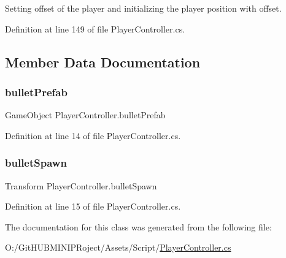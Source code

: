 Setting offset of the player and initializing the player position with offset. 



Definition at line 149 of file Player\+Controller.\+cs.



\subsection{Member Data Documentation}
\mbox{\label{class_player_controller_aa77480fc8964841ac6f4f93b99dba9d9}} 
\subsubsection{\texorpdfstring{bulletPrefab}{bulletPrefab}}
{\footnotesize\ttfamily Game\+Object Player\+Controller.\+bullet\+Prefab}



Definition at line 14 of file Player\+Controller.\+cs.

\mbox{\label{class_player_controller_a45263a41dbdfe88658e0b58196aeba98}} 
\subsubsection{\texorpdfstring{bulletSpawn}{bulletSpawn}}
{\footnotesize\ttfamily Transform Player\+Controller.\+bullet\+Spawn}



Definition at line 15 of file Player\+Controller.\+cs.



The documentation for this class was generated from the following file\+:\begin{DoxyCompactItemize}
\item 
O\+:/\+Git\+H\+U\+B\+M\+I\+N\+I\+P\+Roject/\+Assets/\+Script/\mbox{\hyperlink{_player_controller_8cs}{Player\+Controller.\+cs}}\end{DoxyCompactItemize}
